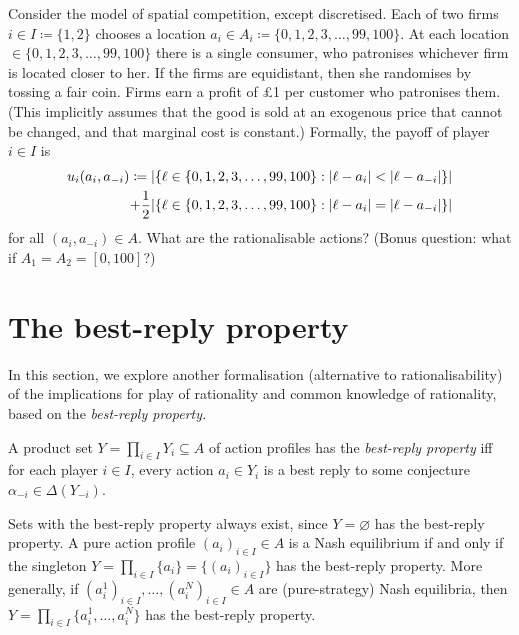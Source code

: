 \begin{exercise}
	\label{exercise:hotelling}
	Consider the \textcite{Hotelling1929} model of spatial competition, except discretised. Each of two firms $i \in I \coloneqq \{1,2\}$ chooses a location $a_i \in A_i \coloneqq \{0,1,2,3,\dots,99,100\}$. At each location $\in \{0,1,2,3,\dots,99,100\}$ there is a single consumer, who patronises whichever firm is located closer to her. If the firms are equidistant, then she randomises by tossing a fair coin. Firms earn a profit of £1 per customer who patronises them. (This implicitly assumes that the good is sold at an exogenous price that cannot be changed, and that marginal cost is constant.) Formally, the payoff of player $i \in I$ is
	\begin{align*}
		u_i(a_i,a_{-i})
		\coloneqq{} &\abs*{ \left\{ \ell \in \{0,1,2,3,\dots,99,100\} : \abs*{ \ell - a_i } < \abs*{ \ell - a_{-i} } \right\} }
		\\
		+ \frac{1}{2} &\abs*{ \left\{ \ell \in \{0,1,2,3,\dots,99,100\} : \abs*{ \ell - a_i } = \abs*{ \ell - a_{-i} } \right\} } 
	\end{align*}
	for all $(a_i,a_{-i}) \in A$. What are the rationalisable actions? (Bonus question: what if $A_1 = A_2 = [0,100]$?)
\end{exercise}



\section{The best-reply property}
\label{dom:br_property}

In this section, we explore another formalisation (alternative to rationalisability) of the implications for play of rationality and common knowledge of rationality, based on the \emph{best-reply property.}

\begin{definition}
	\label{definition:br_set}
	A product set $Y = \prod_{i \in I} Y_i \subseteq A$ of action profiles has the \emph{best-reply property} iff for each player $i \in I$, every action $a_i \in Y_i$ is a best reply to some conjecture $\alpha_{-i} \in \Delta(Y_{-i})$.
\end{definition}

Sets with the best-reply property always exist, since $Y=\varnothing$ has the best-reply property.
A pure action profile $(a_i)_{i \in I} \in A$ is a Nash equilibrium if and only if the singleton $Y = \prod_{i \in I} \{a_i\} = \{(a_i)_{i \in I}\}$ has the best-reply property. More generally, if $(a^1_i)_{i \in I}, \dots, (a^N_i)_{i \in I} \in A$ are (pure-strategy) Nash equilibria, then $Y = \prod_{i \in I} \{a^1_i,\dots,a^N_i\}$ has the best-reply property.

